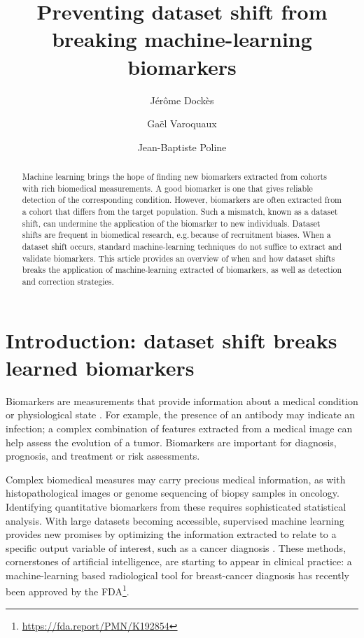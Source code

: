 \documentclass[a4paper,num-refs]{oup-contemporary}
\date{}
\title{Preventing dataset shift from breaking machine-learning
biomarkers}
\author[1, \authfn{1}]{Jérôme Dockès}
\author[1, 2,\authfn{2}]{Gaël Varoquaux}
\author[1, \authfn{2}]{Jean-Baptiste Poline}
\affil[1]{McGill University}
\affil[2]{INRIA}
\newcommand{\eg}{e.g.\,}
\begin{document}
\begin{frontmatter}
\maketitle

\begin{abstract}
  Machine learning brings the hope of finding new biomarkers extracted
  from cohorts with rich biomedical measurements. A good biomarker is one
  that gives reliable detection of the corresponding condition.
  However, biomarkers are often extracted from a cohort that differs
  from the target population. Such a
  mismatch, known as a dataset shift, can undermine the application of the
  biomarker to new individuals.
  Dataset shifts are frequent in biomedical research, \eg because of recruitment biases.
  When a dataset shift occurs, standard machine-learning techniques do not
  suffice to extract and validate biomarkers. This article provides an overview
  of when and how dataset shifts breaks the application of machine-learning extracted of
  biomarkers, as well as detection and correction strategies.
\end{abstract}

\end{frontmatter}

\section{Introduction: dataset shift breaks learned biomarkers}
Biomarkers are measurements that provide information about a medical condition
or physiological state \citep{strimbu2010biomarkers}. For example, the presence
of an antibody may indicate an infection; a complex combination of features
extracted from a medical image can help assess the evolution of a tumor.
%
Biomarkers are important for diagnosis, prognosis, and treatment
or risk assessments.


Complex biomedical measures may carry precious medical information,
as with histopathological images or genome sequencing of biopsy samples in
oncology. Identifying quantitative biomarkers from these requires
sophisticated statistical analysis. With large datasets becoming
accessible, supervised machine learning provides new promises by
optimizing the information extracted to relate to a specific output variable of
interest, such as a cancer diagnosis
\citep{andreu2015big,faust2018deep,deo2015machine}. These methods,
cornerstones of artificial intelligence, are starting to
appear in clinical practice: a machine-learning based radiological tool
for breast-cancer diagnosis has recently been approved by the
FDA\footnote{\url{https://fda.report/PMN/K192854}}.
\end{document}

